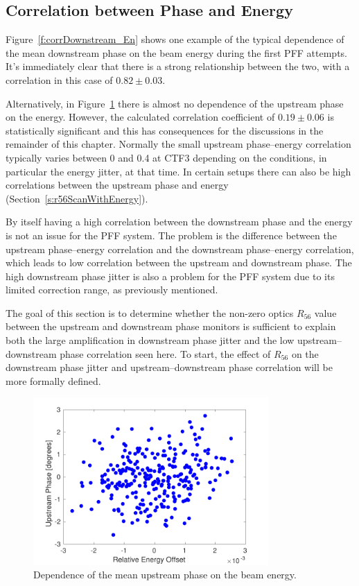 \subsection{Correlation between Phase and Energy}
\label{ss:corrPhaseEnergy}

Figure~\ref{f:corrDownstream_En} shows one example of the typical dependence of the mean downstream phase on the beam energy during the first PFF attempts. It's immediately clear that there is a strong relationship between the two, with a correlation in this case of \(0.82\pm0.03\). 

Alternatively, in Figure~\ref{f:corrUpstream_En} there is almost no dependence of the upstream phase on the energy. However, the calculated correlation coefficient of \(0.19\pm0.06\) is statistically significant and this has consequences for the discussions in the remainder of this chapter. Normally the small upstream phase--energy correlation typically varies between 0 and 0.4 at CTF3 depending on the conditions, in particular the energy jitter, at that time. In certain setups there can also be high correlations between the upstream phase and energy (Section~\ref{s:r56ScanWithEnergy}).

By itself having a high correlation between the downstream phase and the energy is not an issue for the PFF system. The problem is the difference between the upstream phase--energy correlation and the downstream phase--energy correlation, which leads to low correlation between the upstream and downstream phase. The high downstream phase jitter is also a problem for the PFF system due to its limited correction range, as previously mentioned.

The goal of this section is to determine whether the non-zero optics \(R_{56}\) value between the upstream and downstream phase monitors is sufficient to explain both the large amplification in downstream phase jitter and the low upstream--downstream phase correlation seen here. To start, the effect of \(R_{56}\) on the downstream phase jitter and upstream--downstream phase correlation will be more formally defined.

\begin{figure}
  \centering
  \includegraphics[width=0.8\textwidth]{Figures/propagation/corrUpstreamEn}
  \caption{Dependence of the mean upstream phase on the beam energy.}
  \label{f:corrUpstream_En}
\end{figure}

